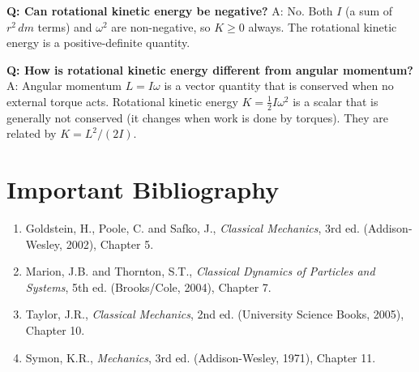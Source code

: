 \textbf{Q: Can rotational kinetic energy be negative?}
A: No. Both $I$ (a sum of $r^2\,dm$ terms) and $\omega^2$ are non-negative, so $K \geq 0$ always. The rotational kinetic energy is a positive-definite quantity.

\textbf{Q: How is rotational kinetic energy different from angular momentum?}
A: Angular momentum $L = I\omega$ is a vector quantity that is conserved when no external torque acts. Rotational kinetic energy $K = \frac{1}{2}I\omega^2$ is a scalar that is generally not conserved (it changes when work is done by torques). They are related by $K = L^2/(2I)$.
\section*{Important Bibliography}

\begin{enumerate}
\item Goldstein, H., Poole, C. and Safko, J., \textit{Classical Mechanics}, 3rd ed. (Addison-Wesley, 2002), Chapter 5.
\item Marion, J.B. and Thornton, S.T., \textit{Classical Dynamics of Particles and Systems}, 5th ed. (Brooks/Cole, 2004), Chapter 7.
\item Taylor, J.R., \textit{Classical Mechanics}, 2nd ed. (University Science Books, 2005), Chapter 10.
\item Symon, K.R., \textit{Mechanics}, 3rd ed. (Addison-Wesley, 1971), Chapter 11.
\end{enumerate}

